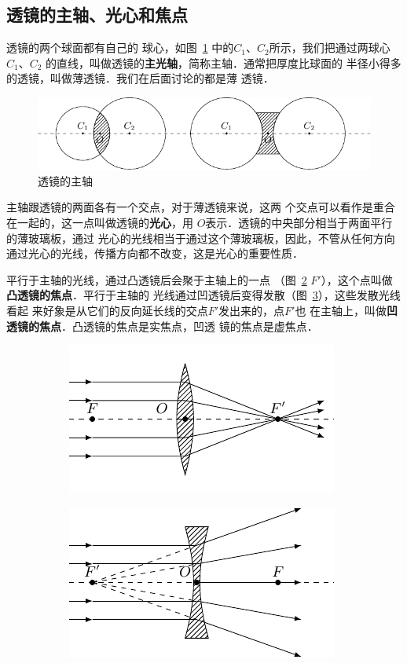 \subsection{透镜的主轴、光心和焦点}

透镜的两个球面都有自己的
球心，如图~\ref{fig_C_5-35} 中的$C_1$、$C_2$所示，我们把通过两球心$C_1$、$C_2$
的直线，叫做透镜的\textbf{主光轴}，简称主轴．通常把厚度比球面的
半径小得多的透镜，叫做薄透镜．我们在后面讨论的都是薄
透镜．
\begin{figure}[htbp]
    \centering
    \includegraphics{fig/C/5-35.pdf}
    \caption{透镜的主轴}\label{fig_C_5-35}
\end{figure}

主轴跟透镜的两面各有一个交点，对于薄透镜来说，这两
个交点可以看作是重合在一起的，这一点叫做透镜的\textbf{光心}，用
$O$表示．透镜的中央部分相当于两面平行的薄玻璃板，通过
光心的光线相当于通过这个薄玻璃板，因此，不管从任何方向
通过光心的光线，传播方向都不改变，这是光心的重要性质．

平行于主轴的光线，通过凸透镜后会聚于主轴上的一点
（图~\ref{fig_C_5-36a} $F'$），这个点叫做\textbf{凸透镜的焦点}．平行于主轴的
光线通过凹透镜后变得发散（图~\ref{fig_C_5-36b}），这些发散光线看起
来好象是从它们的反向延长线的交点$F'$发出来的，点$F'$也
在主轴上，叫做\textbf{凹透镜的焦点}．凸透镜的焦点是实焦点，凹透
镜的焦点是虚焦点．
\begin{figure}[htbp]
    \centering
    \begin{subfigure}{0.4\linewidth}
        \centering
        \includegraphics{fig/C/5-36a.pdf}
        \caption{}\label{fig_C_5-36a}
    \end{subfigure}
    \hfil
    \begin{subfigure}{0.4\linewidth}
        \centering
        \includegraphics{fig/C/5-36b.pdf}
        \caption{}\label{fig_C_5-36b}
    \end{subfigure}
    \caption{}\label{fig_C_5-36}
\end{figure}

